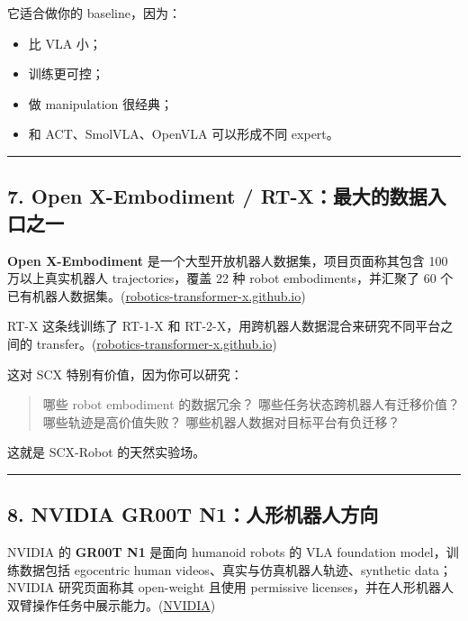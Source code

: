 \documentclass[
  12pt,
]{ctexart}
\providecommand{\tightlist}{%
  \setlength{\itemsep}{0pt}\setlength{\parskip}{0pt}}
\begin{document}
它适合做你的 baseline，因为：

\begin{itemize}
\tightlist
\item
  比 VLA 小；
\item
  训练更可控；
\item
  做 manipulation 很经典；
\item
  和 ACT、SmolVLA、OpenVLA 可以形成不同 expert。
\end{itemize}

\begin{center}\rule{0.5\linewidth}{0.5pt}\end{center}

\subsection{7. Open X-Embodiment /
RT-X：最大的数据入口之一}\label{open-x-embodiment-rt-xux6700ux5927ux7684ux6570ux636eux5165ux53e3ux4e4bux4e00}

\textbf{Open X-Embodiment} 是一个大型开放机器人数据集，项目页面称其包含
100 万以上真实机器人 trajectories，覆盖 22 种 robot
embodiments，并汇聚了 60
个已有机器人数据集。(\href{https://github.com/waymo-research/waymo-open-dataset?utm_source=chatgpt.com}{robotics-transformer-x.github.io})

RT-X 这条线训练了 RT-1-X 和
RT-2-X，用跨机器人数据混合来研究不同平台之间的
transfer。(\href{https://github.com/waymo-research/waymo-open-dataset?utm_source=chatgpt.com}{robotics-transformer-x.github.io})

这对 SCX 特别有价值，因为你可以研究：

\begin{quote}
哪些 robot embodiment 的数据冗余？ 哪些任务状态跨机器人有迁移价值？
哪些轨迹是高价值失败？ 哪些机器人数据对目标平台有负迁移？
\end{quote}

这就是 SCX-Robot 的天然实验场。

\begin{center}\rule{0.5\linewidth}{0.5pt}\end{center}

\subsection{8. NVIDIA GR00T
N1：人形机器人方向}\label{nvidia-gr00t-n1ux4ebaux5f62ux673aux5668ux4ebaux65b9ux5411}

NVIDIA 的 \textbf{GR00T N1} 是面向 humanoid robots 的 VLA foundation
model，训练数据包括 egocentric human
videos、真实与仿真机器人轨迹、synthetic data；NVIDIA 研究页面称其
open-weight 且使用 permissive
licenses，并在人形机器人双臂操作任务中展示能力。(\href{https://robotics-transformer-x.github.io/?utm_source=chatgpt.com}{NVIDIA})
\end{document}
